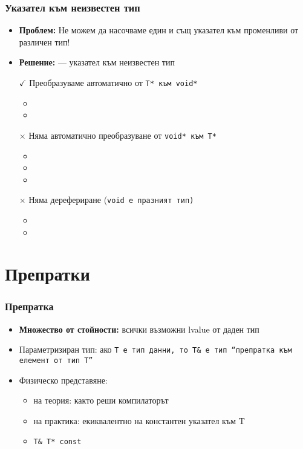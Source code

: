 \documentclass{beamer}
\begin{document}
\begin{frame}
  \frametitle{Указател към неизвестен тип}

  \begin{itemize}[<+->]
  \item \textbf{Проблем:} Не можем да насочваме един и същ указател към променливи от различен тип!
  \item \textbf{Решение:}  --- указател към неизвестен тип
  \item[$\checkmark$] Преобразуваме автоматично от \tt{T*} към \tt{void*}
    \begin{itemize}
    \item {}
    \item {}
    \end{itemize}
  \item[$\times$] \alert{Няма} автоматично преобразуване от \tt{void*} към \tt{T*}
    \begin{itemize}
    \item {}
    \item {}
    \item {}
    \end{itemize}
  \item[$\times$] \alert{Няма} дерефериране (\tt{void} е празният тип)
    \begin{itemize}
    \item {}
    \item {}
    \end{itemize}
  \end{itemize}
\end{frame}

\section{Препратки}

\begin{frame}
  \frametitle{Препратка}

  \begin{itemize}[<+->]
  \item \textbf{Множество от стойности:} всички възможни lvalue от даден тип
  \item Параметризиран тип: ако \tt T е тип данни, то \tt{T\&} е тип ``препратка към елемент от тип \tt T''
  \item Физическо представяне:
    \begin{itemize}
    \item на теория: както реши компилаторът
    \item на практика: екиквалентно на \alert{константен указател към T}
    \item \tt{T\& \eqv T* const}
    \end{itemize}
  \end{itemize}
\end{frame}
\end{document}
